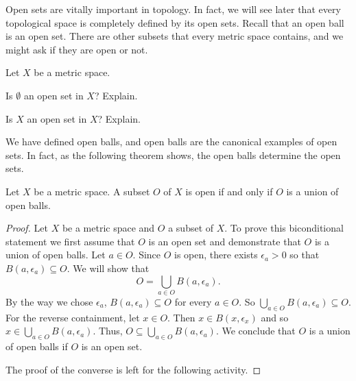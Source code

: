 
Open sets are vitally important in topology. In fact, we will see later that every topological space is completely defined by its open sets. Recall that an open ball is an open set. There are other subsets that every metric space contains, and we might ask if they are open or not.  

\begin{activity} Let $X$ be a metric space.
\ba
\item Is $\emptyset$ an open set in $X$? Explain.

\item Is $X$ an open set in $X$? Explain.

\ea

\end{activity}

\begin{comment}

\ActivitySolution

\ba
\item Since $\emptyset$ contains no points, it follows that $\emptyset$ is a neighborhood of each of its points. So $\emptyset$ is an open set. 

\item Let $a \in X$. For any $\epsilon > 0$, the ball $B(a,\epsilon)$ is a subset of $X$. Thus, $X$ is a neighborhood of each of its points and $X$ is an open set in $X$. 

\ea

\end{comment}


We have defined open balls, and open balls are the canonical examples of open sets. In fact, as the following theorem shows, the open balls determine the open sets.

\begin{theorem} \label{thm:OS_1} Let $X$ be a metric space. A subset $O$ of $X$ is open if and only if $O$ is a union of open balls.
\end{theorem}

\begin{proof} Let $X$ be a metric space and $O$ a subset of $X$. To prove this biconditional statement we first assume that $O$ is an open set and demonstrate that $O$ is a union of open balls. Let $a \in O$. Since $O$ is open, there exists $\epsilon_a > 0$ so that $B(a, \epsilon_a) \subseteq O$. We will show that 
\[O = \bigcup_{a \in O} B(a, \epsilon_a).\]
By the way we chose $\epsilon_a$, $B(a, \epsilon_a) \subseteq O$ for every $a \in O$. So $\bigcup_{a \in O} B(a, \epsilon_a) \subseteq O$. For the reverse containment, let $x \in O$. Then $x \in B(x, \epsilon_x)$ and so $x \in \bigcup_{a \in O} B(a, \epsilon_a)$. Thus, $O \subseteq \bigcup_{a \in O} B(a, \epsilon_a)$. We conclude that $O$ is a union of open balls if $O$ is an open set.

The proof of the converse is left for the following activity.
\end{proof}


